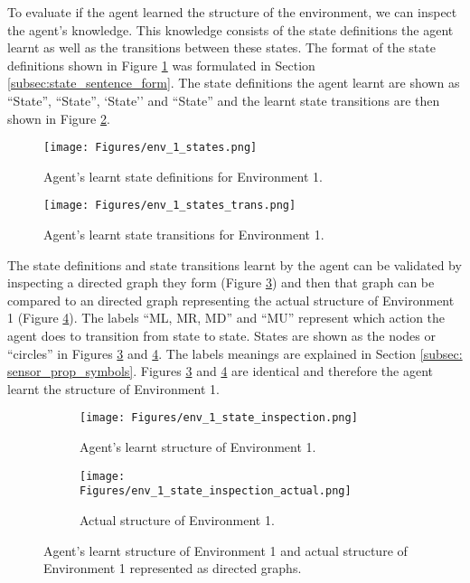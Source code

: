 To evaluate if the agent learned the structure of the environment, we can inspect the agent's knowledge. This knowledge consists of the state definitions the agent learnt as well as the transitions between these states. The format of the state definitions shown in Figure \ref{fig:env_1_state_defs} was formulated in Section \ref{subsec:state_sentence_form}. The state definitions the agent learnt are shown as ``State'', ``State'', `State'' and ``State'' and the learnt state transitions are then shown in Figure \ref{fig:env_1_state_def_transitions}.



\begin{figure}[H]
    \centering
    \texttt{[image: Figures/env\_1\_states.png]}
    \caption{Agent's learnt state definitions for Environment 1.}
    \label{fig:env_1_state_defs}
\end{figure}
\vspace{-1cm}
\begin{figure}[H]
    \centering
    \texttt{[image: Figures/env\_1\_states\_trans.png]}
    \caption{Agent's learnt state transitions for Environment 1.}
    \label{fig:env_1_state_def_transitions}
\end{figure}

The state definitions and state transitions learnt by the agent can be validated by inspecting a directed graph they form (Figure \ref{fig:env_1_learnt}) and then that graph can be compared to an directed graph representing the actual structure of Environment 1 (Figure \ref{fig:env_1_actual}). The labels ``ML, MR, MD'' and ``MU'' represent which action the agent does to transition from state to state. States  are shown as the nodes or ``circles'' in Figures \ref{fig:env_1_learnt} and \ref{fig:env_1_actual}. The labels meanings are explained in Section \ref{subsec: sensor_prop_symbols}. Figures \ref{fig:env_1_learnt} and \ref{fig:env_1_actual} are identical and therefore the agent learnt the structure of Environment 1.

\begin{figure}[H]
\centering
\begin{subfigure}{.5\textwidth}
    \centering
    \texttt{[image: Figures/env\_1\_state\_inspection.png]}
    \caption{Agent's learnt structure of Environment 1.}
    \label{fig:env_1_learnt}
\end{subfigure}%
\begin{subfigure}{.5\textwidth}
    \centering
    \texttt{[image: Figures/env\_1\_state\_inspection\_actual.png]}
    \caption{Actual structure of Environment 1.}
    \label{fig:env_1_actual}
\end{subfigure}
\caption{Agent's learnt structure of Environment 1 and actual structure of Environment 1 represented as directed graphs.}
\label{fig:test}
\end{figure}


